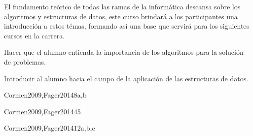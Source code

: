 \begin{syllabus}


\begin{justification}
El fundamento teórico de todas las ramas de la informática descansa sobre los algoritmos y estructuras de datos, este curso brindará a los participantes una introducción a estos témas, formando así una base que servirá para los siguientes cursos en la carrera.
\end{justification}

\begin{goals}
\item Hacer que el alumno entienda la importancia de los algoritmos para la solución de problemas.
\item Introducir al alumno hacia el campo de la aplicación de las estructuras de datos.
\end{goals}



\begin{unit}{\PFFundamentalDataStructuresDef}{}{Cormen2009,Fager2014}{8}{a,b}
   \PFFundamentalDataStructuresAllTopics
   \PFFundamentalDataStructuresAllObjectives
\end{unit}

\begin{unit}{\PFRecursionDef}{}{Cormen2009,Fager2014}{4}{5}
    \PFRecursionAllTopics
    \PFRecursionAllObjectives
\end{unit}

\begin{unit}{\ALFundamentalAlgorithmsDef}{}{Cormen2009,Fager2014}{12}{a,b,c}
    \ALFundamentalAlgorithmsAllTopics
    \ALFundamentalAlgorithmsAllObjectives
\end{unit}


\end{syllabus}
